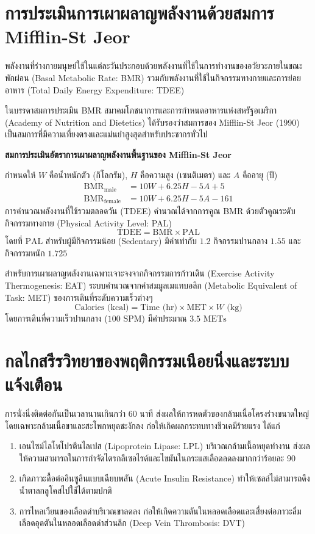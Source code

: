 \section{การประเมินการเผาผลาญพลังงานด้วยสมการ Mifflin-St Jeor}
พลังงานที่ร่างกายมนุษย์ใช้ในแต่ละวันประกอบด้วยพลังงานที่ใช้ในการทำงานของอวัยวะภายในขณะพักผ่อน (Basal Metabolic Rate: BMR) รวมกับพลังงานที่ใช้ในกิจกรรมทางกายและการย่อยอาหาร (Total Daily Energy Expenditure: TDEE)

ในบรรดาสมการประเมิน BMR สมาคมโภชนาการและการกำหนดอาหารแห่งสหรัฐอเมริกา (Academy of Nutrition and Dietetics) ได้รับรองว่าสมการของ Mifflin-St Jeor (1990) เป็นสมการที่มีความเที่ยงตรงและแม่นยำสูงสุดสำหรับประชากรทั่วไป

\begin{theorybox}
\textbf{สมการประเมินอัตราการเผาผลาญพลังงานพื้นฐานของ Mifflin-St Jeor}

กำหนดให้ $W$ คือน้ำหนักตัว (กิโลกรัม), $H$ คือความสูง (เซนติเมตร) และ $A$ คืออายุ (ปี)
\begin{align}
\text{BMR}_{\text{male}} &= 10W + 6.25H - 5A + 5 \\
\text{BMR}_{\text{female}} &= 10W + 6.25H - 5A - 161
\end{align}
การคำนวณพลังงานที่ใช้รวมตลอดวัน (TDEE) คำนวณได้จากการคูณ BMR ด้วยตัวคูณระดับกิจกรรมทางกาย (Physical Activity Level: PAL)
\begin{equation}
\text{TDEE} = \text{BMR} \times \text{PAL}
\end{equation}
โดยที่ $\text{PAL}$ สำหรับผู้มีกิจกรรมน้อย (Sedentary) มีค่าเท่ากับ $1.2$ กิจกรรมปานกลาง $1.55$ และกิจกรรมหนัก $1.725$
\end{theorybox}

สำหรับการเผาผลาญพลังงานเฉพาะเจาะจงจากกิจกรรมการก้าวเดิน (Exercise Activity Thermogenesis: EAT) ระบบคำนวณจากค่าสมมูลเมแทบอลิก (Metabolic Equivalent of Task: MET) ของการเดินที่ระดับความเร็วต่างๆ
\begin{equation}
\text{Calories (kcal)} = \text{Time (hr)} \times \text{MET} \times W\text{ (kg)}
\end{equation}
โดยการเดินที่ความเร็วปานกลาง ($100\text{ SPM}$) มีค่าประมาณ $3.5\text{ METs}$

\section{กลไกสรีรวิทยาของพฤติกรรมเนือยนิ่งและระบบแจ้งเตือน}
การนั่งนิ่งติดต่อกันเป็นเวลานานเกินกว่า 60 นาที ส่งผลให้การหดตัวของกล้ามเนื้อโครงร่างขนาดใหญ่โดยเฉพาะกล้ามเนื้อขาและสะโพกหยุดชะงักลง ก่อให้เกิดผลกระทบทางชีวเคมีร้ายแรง ได้แก่
\begin{enumerate}
    \item เอนไซม์ไลโพโปรตีนไลเปส (Lipoprotein Lipase: LPL) บริเวณกล้ามเนื้อหยุดทำงาน ส่งผลให้ความสามารถในการกำจัดไตรกลีเซอไรด์และไขมันในกระแสเลือดลดลงมากกว่าร้อยละ 90
    \item เกิดภาวะดื้อต่ออินซูลินแบบเฉียบพลัน (Acute Insulin Resistance) ทำให้เซลล์ไม่สามารถดึงน้ำตาลกลูโคสไปใช้ได้ตามปกติ
    \item การไหลเวียนของเลือดดำบริเวณขาลดลง ก่อให้เกิดความดันในหลอดเลือดและเสี่ยงต่อภาวะลิ่มเลือดอุดตันในหลอดเลือดดำส่วนลึก (Deep Vein Thrombosis: DVT)
\end{enumerate}

